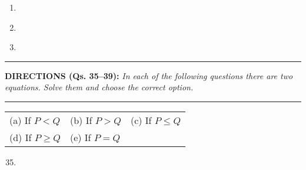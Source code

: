 \begin{multicols}{2}
\begin{enumerate}[leftmargin=*]
\item 
\begin{itemize}
\end{itemize}

\item 
\begin{itemize}
\end{itemize}

\item 
\begin{itemize}
\end{itemize}
\end{enumerate}


\noindent
\rule{\columnwidth}{1pt}

\noindent
{\sf\bfseries DIRECTIONS (Qs. 35--39):} {\it In each of the following questions there are two equations. Solve them and choose the correct option.}

\noindent
\rule{\columnwidth}{1pt}

\begin{tabular}{l@{\qquad\quad}l@{\qquad\quad}l}
(a) If $P<Q$ & (b) If $P>Q$ & (c) If $P\leq Q$\\
(d) If $P\geq Q$ & (e) If $P=Q$ 
\end{tabular}

\begin{enumerate}[leftmargin=*]
\setcounter{enumi}{34}
\item 
\begin{itemize}
\end{itemize}


\end{enumerate}
\end{multicols}
